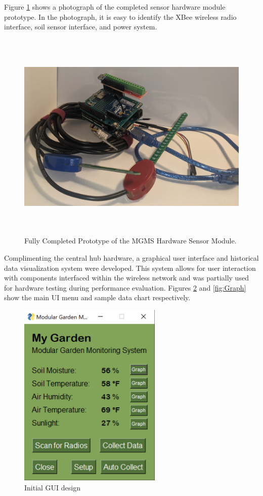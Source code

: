 \documentclass{report}
\begin{document}
Figure \ref{fig:Prototype} shows a photograph of the completed sensor hardware module prototype. In the photograph, it is easy to identify the XBee wireless radio interface, soil sensor interface, and power system.\\

\begin{figure}[H] %
    \centering
    \includegraphics[height=4in]{PNGs/Prototype.jpg}
    \caption{Fully Completed Prototype of the MGMS Hardware Sensor Module.}
    \label{fig:Prototype}
\end{figure}

Complimenting the central hub hardware, a graphical user interface and historical data visualization system were developed. This system allows for user interaction with components interfaced within the wireless network and was partially used for hardware testing during performance evaluation. Figures \ref{fig:GUI} and \ref{fig:Graph} show the main UI menu and sample data chart respectively.\\

\begin{figure}[H] %
    \centering
    \includegraphics[height=3.5in]{PNGs/GUI.png}
    \caption{Initial GUI design}
    \label{fig:GUI}
\end{figure}
\end{document}
